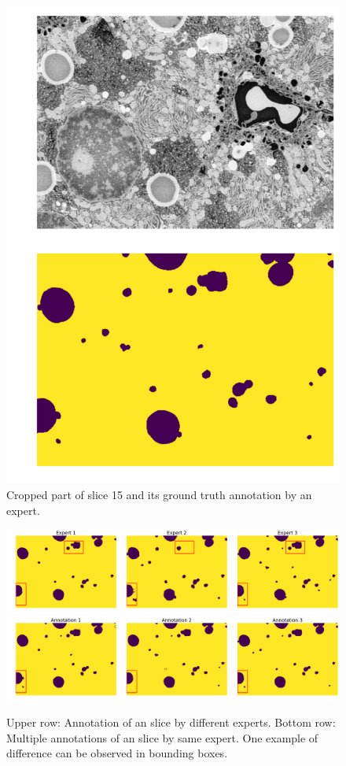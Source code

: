 \begin{figure}[h!] \label{fig:2dslice}
\centering
 \includegraphics[width=0.7\linewidth]{figures/ex_slice.pdf}
\caption{Cropped part of slice 15 and its ground truth annotation by an expert.}
\end{figure}

\begin{figure}[h!] \label{fig:diffexperts}
 \includegraphics[width=1.0\linewidth]{figures/different_expert.pdf} \\
  \includegraphics[width=1.0\linewidth]{figures/same_expert.pdf}
\caption{Upper row: Annotation of an slice by different experts. Bottom row: Multiple annotations of an slice by same expert. One example of difference can be observed in bounding boxes.}
\end{figure}

